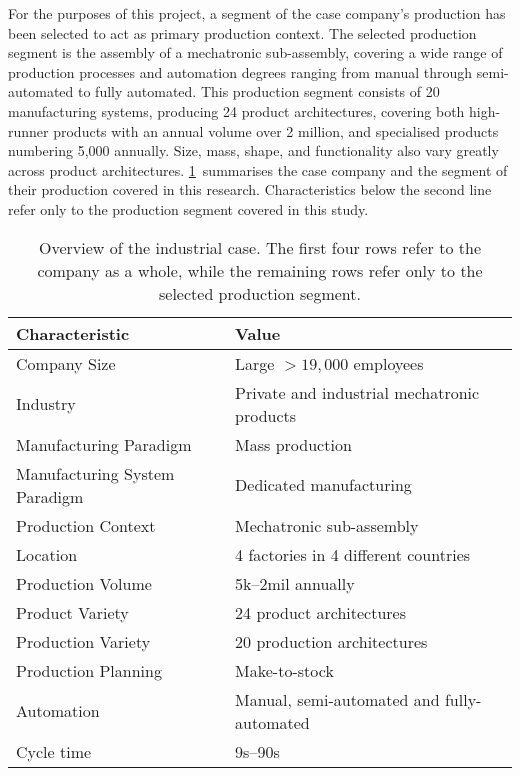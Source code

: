 For the purposes of this \PhD{} project, a segment of the case company's production has been selected to act as primary production context.
The selected production segment is the assembly of a mechatronic sub-assembly, covering a wide range of production processes and automation degrees ranging from manual through semi-automated to fully automated.
This production segment consists of 20 manufacturing systems, producing 24 product architectures, covering both high-runner products with an annual volume over 2 million, and specialised products numbering 5,000 annually.
Size, mass, shape, and functionality also vary greatly across product architectures.
\cref{tab:caseOverview}~summarises the case company and the segment of their production covered in this research.
Characteristics below the second line refer only to the production segment covered in this study.
\begin{table}[tb]
  \centering
  \caption[Overview of the industrial case.]
  {Overview of the industrial case.
  The first four rows refer to the company as a whole, while the remaining rows refer only to the selected production segment.}\label{tab:caseOverview}
  \small
  \begin{tabular}{ll}
    \toprule%
    Characteristic & Value\\
    \midrule
    Company Size & Large \(>19,000\) employees\\
    Industry & Private and industrial mechatronic products\\
    Manufacturing Paradigm & Mass production\\
    Manufacturing System Paradigm & Dedicated manufacturing\\
    \midrule
    Production Context & Mechatronic sub-assembly\\
    Location & 4 factories in 4 different countries\\
    Production Volume & 5k--2mil annually\\
    Product Variety & 24 product architectures\\
    Production Variety & 20 production architectures\\
    Production Planning & Make-to-stock\\
    Automation & Manual, semi-automated and fully-automated\\
    Cycle time & 9\si{\second}--90\si{\second}\\
    \bottomrule%
  \end{tabular}
\end{table}